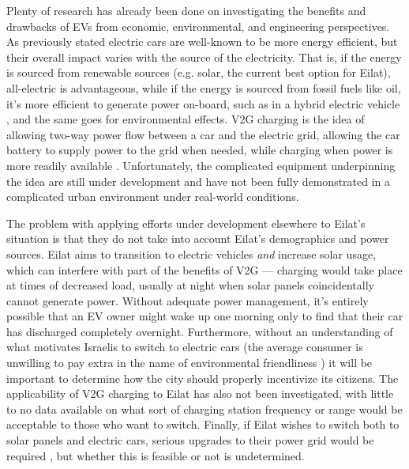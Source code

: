 \documentclass{article}                         %
\begin{document}
Plenty of research has already been done on investigating the benefits and drawbacks of EVs from economic, environmental, and engineering perspectives. As previously stated electric cars are well-known to be more energy efficient, but their overall impact varies with the source of the electricity. That is, if the energy is sourced from renewable sources (e.g. solar, the current best option for Eilat), all-electric is advantageous, while if the energy is sourced from fossil fuels like oil, it's more efficient to generate power on-board, such as in a hybrid electric vehicle \cite{Dincer2010EconomicOptions}, and the same goes for environmental effects. V2G charging is the idea of allowing two-way power flow between a car and the electric grid, allowing the car battery to supply power to the grid when needed, while charging when power is more readily available \cite{Mahmud2015PowerEV}. Unfortunately, the complicated equipment underpinning the idea are still under development \cite{2018Nuvve...} and have not been fully demonstrated in a complicated urban environment under real-world conditions.

The problem with applying efforts under development elsewhere to Eilat's situation is that they do not take into account Eilat's demographics and power sources. Eilat aims to transition to electric vehicles \textit{and} increase solar usage, which can interfere with part of the benefits of V2G --- charging would take place at times of decreased load, usually at night when solar panels coincidentally cannot generate power. Without adequate power management, it's entirely possible that an EV owner might wake up one morning only to find that their car has discharged completely overnight. Furthermore, without an understanding of what motivates Israelis to switch to electric cars (the average consumer is unwilling to pay extra in the name of environmental friendliness \cite{Mock2010MarketVehicles}) it will be important to determine how the city should properly incentivize its citizens. The applicability of V2G charging to Eilat has also not been investigated, with little to no data available on what sort of charging station frequency or range would be acceptable to those who want to switch. Finally, if Eilat wishes to switch both to solar panels and electric cars, serious upgrades to their power grid would be required \cite{Vardimon2011AssessmentIsrael}, but whether this is feasible or not is undetermined.
\end{document}

